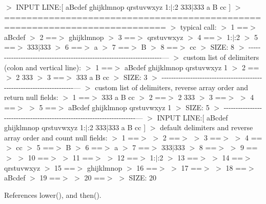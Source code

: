 $>$ I\+N\+P\+UT L\+I\+NE\+:\mbox{[} a\+Bcdef ghijklmnop qrstuvwxyz 1\+:$\vert$\+:2 333$\vert$333 a B cc \mbox{]} $>$ =========================================================================== $>$ typical call\+: $>$ 1 ==$>$ a\+Bcdef $>$ 2 ==$>$ ghijklmnop $>$ 3 ==$>$ qrstuvwxyz $>$ 4 ==$>$ 1\+:$\vert$\+:2 $>$ 5 ==$>$ 333$\vert$333 $>$ 6 ==$>$ a $>$ 7 ==$>$ B $>$ 8 ==$>$ cc $>$ S\+I\+ZE\+: 8 $>$ -\/-\/-\/-\/-\/-\/-\/-\/-\/-\/-\/-\/-\/-\/-\/-\/-\/-\/-\/-\/-\/-\/-\/-\/-\/-\/-\/-\/-\/-\/-\/-\/-\/-\/-\/-\/-\/-\/-\/-\/-\/-\/-\/-\/-\/-\/-\/-\/-\/-\/-\/-\/-\/-\/-\/-\/-\/-\/-\/-\/-\/-\/-\/-\/-\/-\/-\/-\/-\/-\/-\/--- $>$ custom list of delimiters (colon and vertical line)\+: $>$ 1 ==$>$ a\+Bcdef ghijklmnop qrstuvwxyz 1 $>$ 2 ==$>$ 2 333 $>$ 3 ==$>$ 333 a B cc $>$ S\+I\+ZE\+: 3 $>$ -\/-\/-\/-\/-\/-\/-\/-\/-\/-\/-\/-\/-\/-\/-\/-\/-\/-\/-\/-\/-\/-\/-\/-\/-\/-\/-\/-\/-\/-\/-\/-\/-\/-\/-\/-\/-\/-\/-\/-\/-\/-\/-\/-\/-\/-\/-\/-\/-\/-\/-\/-\/-\/-\/-\/-\/-\/-\/-\/-\/-\/-\/-\/-\/-\/-\/-\/-\/-\/-\/-\/--- $>$ custom list of delimiters, reverse array order and return null fields\+: $>$ 1 ==$>$ 333 a B cc $>$ 2 ==$>$ 2 333 $>$ 3 ==$>$ $>$ 4 ==$>$ $>$ 5 ==$>$ a\+Bcdef ghijklmnop qrstuvwxyz 1 $>$ S\+I\+ZE\+: 5 $>$ -\/-\/-\/-\/-\/-\/-\/-\/-\/-\/-\/-\/-\/-\/-\/-\/-\/-\/-\/-\/-\/-\/-\/-\/-\/-\/-\/-\/-\/-\/-\/-\/-\/-\/-\/-\/-\/-\/-\/-\/-\/-\/-\/-\/-\/-\/-\/-\/-\/-\/-\/-\/-\/-\/-\/-\/-\/-\/-\/-\/-\/-\/-\/-\/-\/-\/-\/-\/-\/-\/-\/--- $>$ I\+N\+P\+UT L\+I\+NE\+:\mbox{[} a\+Bcdef ghijklmnop qrstuvwxyz 1\+:$\vert$\+:2 333$\vert$333 a B cc \mbox{]} $>$ default delimiters and reverse array order and count null fields\+: $>$ 1 ==$>$ $>$ 2 ==$>$ $>$ 3 ==$>$ $>$ 4 ==$>$ cc $>$ 5 ==$>$ B $>$ 6 ==$>$ a $>$ 7 ==$>$ 333$\vert$333 $>$ 8 ==$>$ $>$ 9 ==$>$ $>$ 10 ==$>$ $>$ 11 ==$>$ $>$ 12 ==$>$ 1\+:$\vert$\+:2 $>$ 13 ==$>$ $>$ 14 ==$>$ qrstuvwxyz $>$ 15 ==$>$ ghijklmnop $>$ 16 ==$>$ $>$ 17 ==$>$ $>$ 18 ==$>$ a\+Bcdef $>$ 19 ==$>$ $>$ 20 ==$>$ $>$ S\+I\+ZE\+: 20 

References lower(), and then().

